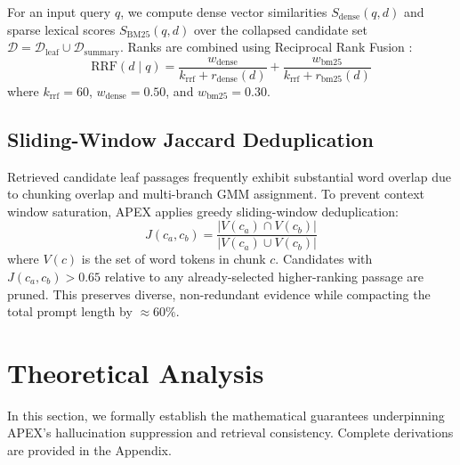 \documentclass[11pt,a4paper]{article}
\begin{document}
For an input query $q$, we compute dense vector similarities $S_{\text{dense}}(q, d)$ and sparse lexical scores $S_{\text{BM25}}(q, d)$ over the collapsed candidate set $\mathcal{D} = \mathcal{D}_{\text{leaf}} \cup \mathcal{D}_{\text{summary}}$. Ranks are combined using Reciprocal Rank Fusion \cite{cormack2009reciprocal}:
\begin{equation}
    \text{RRF}(d \mid q) = \frac{w_{\text{dense}}}{k_{\text{rrf}} + r_{\text{dense}}(d)} + \frac{w_{\text{bm25}}}{k_{\text{rrf}} + r_{\text{bm25}}(d)}
\end{equation}
where $k_{\text{rrf}} = 60$, $w_{\text{dense}} = 0.50$, and $w_{\text{bm25}} = 0.30$.

\subsection{Sliding-Window Jaccard Deduplication}
Retrieved candidate leaf passages frequently exhibit substantial word overlap due to chunking overlap and multi-branch GMM assignment. To prevent context window saturation, APEX applies greedy sliding-window deduplication:
\begin{equation}
    J(c_a, c_b) = \frac{|V(c_a) \cap V(c_b)|}{|V(c_a) \cup V(c_b)|}
\end{equation}
where $V(c)$ is the set of word tokens in chunk $c$. Candidates with $J(c_a, c_b) > 0.65$ relative to any already-selected higher-ranking passage are pruned. This preserves diverse, non-redundant evidence while compacting the total prompt length by $\approx 60\%$.

\section{Theoretical Analysis}
\label{sec:theory}

In this section, we formally establish the mathematical guarantees underpinning APEX's hallucination suppression and retrieval consistency. Complete derivations are provided in the Appendix.
\end{document}
